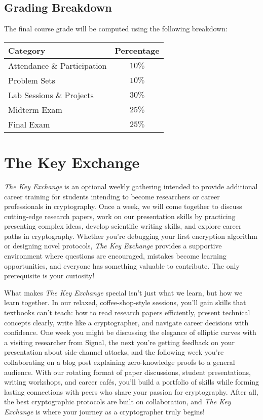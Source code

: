 \documentclass[10pt,a4paper,american]{article}
\begin{document}
\subsection{Grading Breakdown}
The final course grade will be computed using the following breakdown:

\begin{center}
	\renewcommand{\arraystretch}{2}
	\begin{tabular}{|p{2.5in}|c|}
		\hline
		\textbf{Category} & \textbf{Percentage} \\
		\hline
		Attendance \& Participation               & $10\%$              \\
		\hline
		Problem Sets                              & $10\%$              \\
		\hline
		Lab Sessions \& Projects                  & $30\%$              \\
		\hline
		Midterm Exam                              & $25\%$              \\
		\hline
		Final Exam                                & $25\%$              \\
		\hline
	\end{tabular}
\end{center}

\section{The Key Exchange}
\textit{The Key Exchange} is an optional weekly gathering intended to provide additional career training for students intending to become researchers or career professionals in cryptography. Once a week, we will come together to discuss cutting-edge research papers, work on our presentation skills by practicing presenting complex ideas, develop scientific writing skills, and explore career paths in cryptography. Whether you're debugging your first encryption algorithm or designing novel protocols, \textit{The Key Exchange} provides a supportive environment where questions are encouraged, mistakes become learning opportunities, and everyone has something valuable to contribute. The only prerequisite is your curiosity!

What makes \textit{The Key Exchange} special isn't just what we learn, but how we learn together. In our relaxed, coffee-shop-style sessions, you'll gain skills that textbooks can't teach: how to read research papers efficiently, present technical concepts clearly, write like a cryptographer, and navigate career decisions with confidence. One week you might be discussing the elegance of elliptic curves with a visiting researcher from Signal, the next you're getting feedback on your presentation about side-channel attacks, and the following week you're collaborating on a blog post explaining zero-knowledge proofs to a general audience. With our rotating format of paper discussions, student presentations, writing workshops, and career cafés, you'll build a portfolio of skills while forming lasting connections with peers who share your passion for cryptography. After all, the best cryptographic protocols are built on collaboration, and \textit{The Key Exchange} is where your journey as a cryptographer truly begins!
\end{document}
